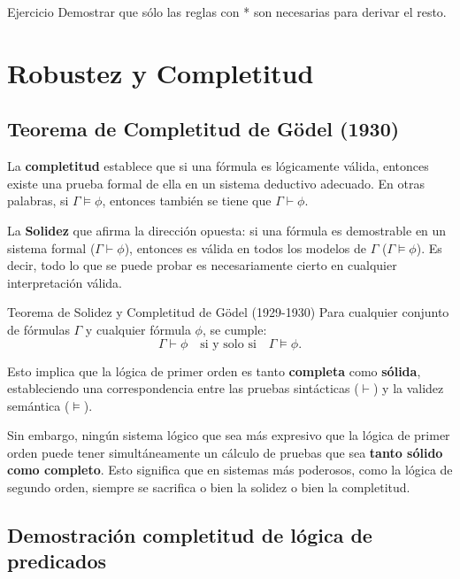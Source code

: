\begin{exampleblock}{Ejercicio}
Demostrar que sólo las reglas con * son necesarias para derivar el resto.
\end{exampleblock}



\section{Robustez y Completitud}

\subsection{Teorema de Completitud de Gödel (1930)} 

La \textbf{completitud} establece que si una fórmula es lógicamente válida, entonces existe una prueba formal de ella en un sistema deductivo adecuado. En otras palabras, si $\Gamma \models \phi$, entonces también se tiene que $\Gamma \vdash \phi$. 

La \textbf{Solidez} que afirma la dirección opuesta: si una fórmula es demostrable en un sistema formal ($\Gamma \vdash \phi$), entonces es válida en todos los modelos de $\Gamma$ ($\Gamma \models \phi$). Es decir, todo lo que se puede probar es necesariamente cierto en cualquier interpretación válida. 

\begin{thmblock}{Teorema de Solidez y Completitud de Gödel (1929-1930)}
Para cualquier conjunto de fórmulas $\Gamma$ y cualquier fórmula $\phi$, se cumple:
\[
\Gamma \vdash \phi \quad \text{si y solo si} \quad \Gamma \models \phi.
\]
\end{thmblock}

Esto implica que la lógica de primer orden es tanto \textbf{completa} como \textbf{sólida}, estableciendo una correspondencia entre las pruebas sintácticas ($\vdash$) y la validez semántica ($\models$).

Sin embargo, ningún sistema lógico que sea más expresivo que la lógica de primer orden puede tener simultáneamente un cálculo de pruebas que sea \textbf{tanto sólido como completo}. Esto significa que en sistemas más poderosos, como la lógica de segundo orden, siempre se sacrifica o bien la solidez o bien la completitud.


\subsection{Demostración completitud de lógica de predicados }

